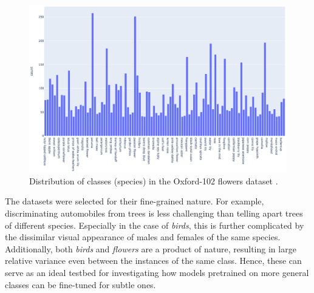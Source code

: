 \begin{figure}
  \centering
  \includegraphics[width=1 \linewidth]{figures/flower_classes.png}
  \caption{Distribution of classes (species) in the Oxford-102 flowers dataset \cite{Nilsback08}.}
  \label{fig:flowers_histogram}
\end{figure}

The datasets were selected for their fine-grained nature. For example, discriminating automobiles from trees is less challenging than telling apart trees of different species. Especially in the case of \textit{birds}, this is further complicated by the dissimilar visual appearance of males and females of the same species. Additionally, both \textit{birds} and \textit{flowers} are a product of nature, resulting in large relative variance even between the instances of the same class. Hence, these can serve as an ideal testbed for investigating how models pretrained on more general classes can be fine-tuned for subtle ones.
